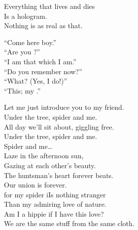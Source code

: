 
Everything that lives and dies \\
Is a hologram. \\
Nothing is as real as that. \\


``Come here boy.'' \\
``Are you ?'' \\
``I am that which I am.'' \\

``Do you remember now?'' \\
``What? (Yes, I do!)'' \\
``This; my .'' \\









Let me just introduce you to my friend. \\
Under the tree, spider and me. \\
All day we'll sit about, giggling free. \\
Under the tree, spider and me. \\

Spider and me… \\

Laze in the afternoon sun, \\
Gazing at each other's beauty. \\
The huntsman's heart forever beats. \\
Our union is forever. \\

 for my spider iIs nothing stranger \\
Than my admiring love of nature. \\
Am I a hippie if I have this love? \\
We are the same stuff from the same cloth. \\


